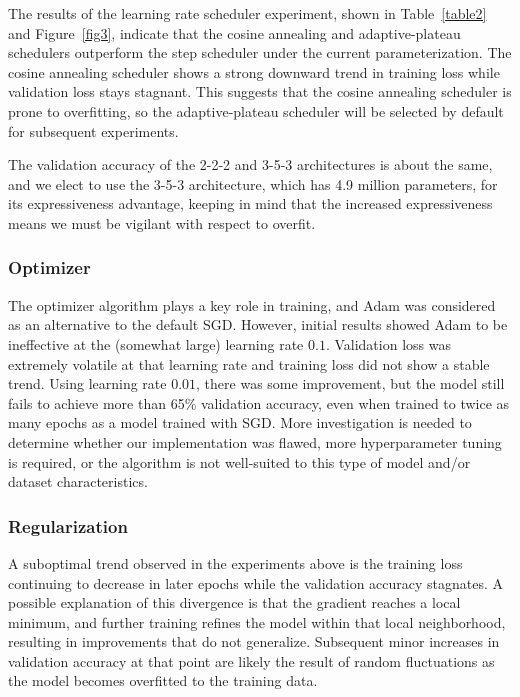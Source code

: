 \documentclass[letterpaper]{article} %
\begin{document}
The results of the learning rate scheduler experiment, shown in Table~\ref{table2} and Figure~\ref{fig3}, indicate that
the cosine annealing and adaptive-plateau schedulers outperform the step scheduler under the current
parameterization.
The cosine annealing scheduler shows a strong downward trend in training loss while validation loss
stays stagnant.
This suggests that the cosine annealing scheduler is prone to overfitting, so the
adaptive-plateau scheduler will be selected by default for subsequent experiments.

The validation accuracy of the 2-2-2 and 3-5-3 architectures is about the same,
and we elect to use the 3-5-3 architecture, which has 4.9 million parameters, for its expressiveness
advantage, keeping in mind that the increased expressiveness means we must be vigilant
with respect to overfit.

\subsubsection{Optimizer}

The optimizer algorithm plays a key role in training, and Adam was considered as an alternative to the default SGD\@.
However, initial results showed Adam to be ineffective at the (somewhat large) learning rate $ 0.1 $.
Validation loss was extremely volatile
at that learning rate and training loss did not show a stable trend.
Using learning rate $ 0.01 $, there was some improvement, but the model still fails to achieve more than 65\% validation
accuracy, even when trained to twice as many epochs as a model trained with SGD\@.
More investigation is needed to
determine whether our implementation was flawed, more hyperparameter tuning is required, or
the algorithm is not well-suited to this type of model and/or dataset characteristics.

\subsubsection{Regularization}

A suboptimal trend observed in the experiments above is the training loss continuing to decrease in later
epochs while the validation accuracy stagnates.
A possible explanation of this divergence is that the gradient reaches a local minimum, and further training
refines the model within that local neighborhood, resulting in improvements that do not generalize.
Subsequent minor increases in validation accuracy at that point are likely the result of random fluctuations as the
model becomes overfitted to the training data.
\end{document}
